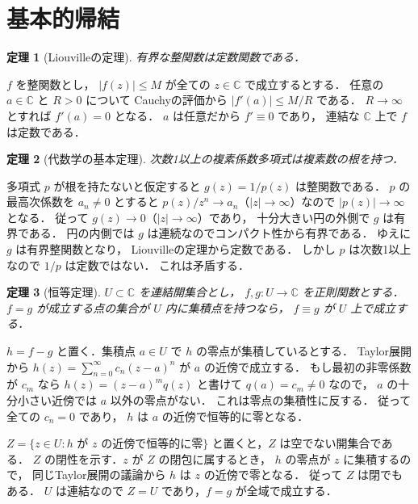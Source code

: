\documentclass[a5paper,10pt,onecolumn]{jsarticle}
\makeatletter
\theoremstyle{mathnotetheorem}
\newtheorem{theorem}{定理}[section]
\renewcommand{\proofname}{証明}
\renewenvironment{proof}[1][\proofname]{%
  \par\pushQED{\qed}\normalfont\topsep4\p@\@plus2\p@\relax
  \trivlist\item[\hskip\labelsep\bfseries #1]\ignorespaces
}{\popQED\endtrivlist\@endpefalse}
\makeatother
\begin{document}
\section{基本的帰結}

\begin{theorem}[Liouvilleの定理]\label{thm:liouville}
有界な整関数は定数関数である．
\end{theorem}
\begin{proof}
$f$ を整関数とし，
$|f(z)|\le M$ が全ての $z\in\mathbb C$ で成立するとする．
任意の $a\in\mathbb C$ と $R>0$ について
Cauchyの評価から $|f'(a)|\le M/R$ である．
$R\to\infty$ とすれば $f'(a)=0$ となる．
$a$ は任意だから $f'\equiv0$ であり，
連結な $\mathbb C$ 上で $f$ は定数である．
\end{proof}

\begin{theorem}[代数学の基本定理]\label{thm:fta}
次数1以上の複素係数多項式は複素数の根を持つ．
\end{theorem}
\begin{proof}
多項式 $p$ が根を持たないと仮定すると
$g(z)=1/p(z)$ は整関数である．
$p$ の最高次係数を $a_n\ne0$ とすると
$p(z)/z^n\to a_n$（$|z|\to\infty$）なので
$|p(z)|\to\infty$ となる．
従って $g(z)\to0$（$|z|\to\infty$）であり，
十分大きい円の外側で $g$ は有界である．
円の内側では $g$ は連続なのでコンパクト性から有界である．
ゆえに $g$ は有界整関数となり，
Liouvilleの定理から定数である．
しかし $p$ は次数1以上なので $1/p$ は定数ではない．
これは矛盾する．
\end{proof}

\begin{theorem}[恒等定理]\label{thm:identity}
$U\subset\mathbb C$ を連結開集合とし，
$f,g:U\to\mathbb C$ を正則関数とする．
$f=g$ が成立する点の集合が $U$ 内に集積点を持つなら，
$f\equiv g$ が $U$ 上で成立する．
\end{theorem}
\begin{proof}
$h=f-g$ と置く．集積点 $a\in U$ で
$h$ の零点が集積しているとする．
Taylor展開から
$h(z)=\sum_{n=0}^\infty c_n(z-a)^n$ が
$a$ の近傍で成立する．
もし最初の非零係数が $c_m$ なら
$h(z)=(z-a)^m q(z)$ と書けて
$q(a)=c_m\ne0$ なので，
$a$ の十分小さい近傍では $a$ 以外の零点がない．
これは零点の集積性に反する．
従って全ての $c_n=0$ であり，
$h$ は $a$ の近傍で恒等的に零となる．

$Z=\{z\in U:h\text{ が }z\text{ の近傍で恒等的に零}\}$
と置くと，$Z$ は空でない開集合である．
$Z$ の閉性を示す．$z$ が $Z$ の閉包に属するとき，
$h$ の零点が $z$ に集積するので，
同じTaylor展開の議論から $h$ は $z$ の近傍で零となる．
従って $Z$ は閉でもある．
$U$ は連結なので $Z=U$ であり，$f=g$ が全域で成立する．
\end{proof}
\end{document}
